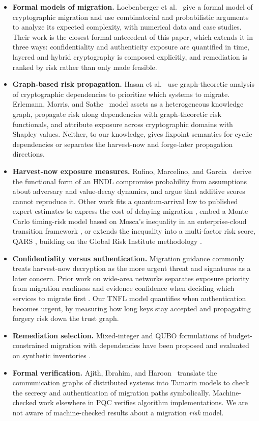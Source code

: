 \documentclass[conference]{IEEEtran}
\begin{document}
\begin{itemize}
\item \textbf{Formal models of migration.} Loebenberger et al.~\cite{loebenberger2024} give a formal model of cryptographic migration and use combinatorial and probabilistic arguments to analyze its expected complexity, with numerical data and case studies. Their work is the closest formal antecedent of this paper, which extends it in three ways: confidentiality and authenticity exposure are quantified in time, layered and hybrid cryptography is composed explicitly, and remediation is ranked by risk rather than only made feasible.
\item \textbf{Graph-based risk propagation.} Hasan et al.~\cite{hasan2024} use graph-theoretic analysis of cryptographic dependencies to prioritize which systems to migrate. Erlemann, Morris, and Sathe~\cite{erlemann2026} model assets as a heterogeneous knowledge graph, propagate risk along dependencies with graph-theoretic risk functionals, and attribute exposure across cryptographic domains with Shapley values. Neither, to our knowledge, gives fixpoint semantics for cyclic dependencies or separates the harvest-now and forge-later propagation directions.
\item \textbf{Harvest-now exposure measures.} Rufino, Marcelino, and Garcia~\cite{rufino2026} derive the functional form of an HNDL compromise probability from assumptions about adversary and value-decay dynamics, and argue that additive scores cannot reproduce it. Other work fits a quantum-arrival law to published expert estimates to express the cost of delaying migration \cite{shaw2026}, embed a Monte Carlo timing-risk model based on Mosca's inequality in an enterprise-cloud transition framework \cite{gupta2026}, or extends the inequality into a multi-factor risk score, QARS \cite{grigaliunas2025}, building on the Global Risk Institute methodology \cite{mosca2017}.
\item \textbf{Confidentiality versus authentication.} Migration guidance commonly treats harvest-now decryption as the more urgent threat and signatures as a later concern. Prior work on wide-area networks separates exposure priority from migration readiness and evidence confidence when deciding which services to migrate first \cite{alam2026}. Our TNFL model quantifies when authentication becomes urgent, by measuring how long keys stay accepted and propagating forgery risk down the trust graph.
\item \textbf{Remediation selection.} Mixed-integer and QUBO formulations of budget-constrained migration with dependencies have been proposed and evaluated on synthetic inventories \cite{figueira2026}.
\item \textbf{Formal verification.} Ajith, Ibrahim, and Haroon~\cite{ajith2026} translate the communication graphs of distributed systems into Tamarin models to check the secrecy and authentication of migration paths symbolically. Machine-checked work elsewhere in PQC verifies algorithm implementations. We are not aware of machine-checked results about a migration \emph{risk} model.
\end{itemize}
\end{document}
